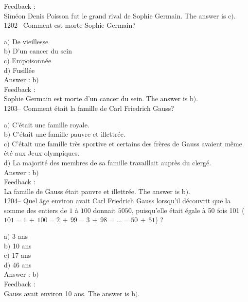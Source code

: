\documentclass[letterpaper, 12pt]{article}
\begin{document}
Feedback : \\
Sim\'eon Denis Poisson fut le grand rival de Sophie Germain.
The answer is c$)$.\\

1202-- Comment est morte Sophie Germain?

a$)$ De vieillesse \\
b$)$ D'un cancer du sein \\
c$)$ Empoisonn\'ee \\
d$)$ Fusill\'ee\\

Answer : b$)$\\

Feedback : \\
Sophie Germain est morte d'un cancer du sein.
The answer is b$)$.\\

1203-- Comment \'etait la famille de Carl Friedrich Gauss?

a$)$ C'\'etait une famille royale. \\
b$)$ C'\'etait une famille pauvre et illettr\'ee. \\
c$)$ C'\'etait une famille tr\`es sportive et certains des fr\`eres de Gauss
avaient m\^eme \'et\'e aux Jeux olympiques. \\
d$)$ La majorit\'e des membres de sa famille travaillait aupr\`es du
clerg\'e.\\

Answer : b$)$\\

Feedback : \\
La famille de Gauss \'etait pauvre et illettr\'ee.
The answer is b$)$.\\

1204-- Quel \^age environ avait Carl Friedrich Gauss lorsqu'il
d\'ecouvrit que la somme des entiers de $1$ \`a $100$ donnait
$5050$, puisqu'elle \'etait \'egale \`a 50 fois 101
($101=1\,+\,100=2\,+\,99=3\,+\,98=\ldots=50\,+\,51$) ?

a$)$ 3 ans \\
b$)$ 10 ans \\
c$)$ 17 ans \\
d$)$ 46 ans\\

Answer : b$)$\\

Feedback : \\
Gauss avait environ 10 ans.
The answer is b$)$.\\
\end{document}
